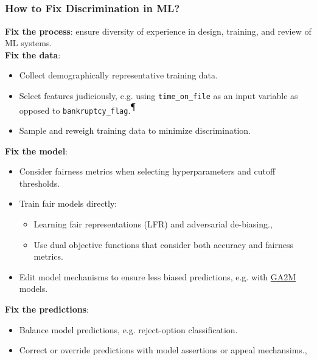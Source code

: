 \documentclass[11pt,
               		aspectratio=169,
               		hyperref={colorlinks}
               		]{beamer}
\begin{document}
		\subsection*{}
		\begin{frame}			
			\frametitle{How to Fix Discrimination in ML?}
			\scriptsize
			\noindent \textbf{Fix the process}: ensure diversity of experience in design, training, and review of ML systems.\\
			\noindent \textbf{Fix the data}:
			\begin{itemize}\scriptsize
				\item Collect demographically representative training data.
				\item Select features judiciously, e.g. using \texttt{time\_on\_file} as an input variable as opposed to \texttt{bankruptcy\_flag}.\textsuperscript{$\mathparagraph$}
				\item Sample and reweigh training data to minimize discrimination.\cite{kamiran2012data}
			\end{itemize}
			\noindent \textbf{Fix the model}:
			\begin{itemize}\scriptsize
				\item Consider fairness metrics when selecting hyperparameters and cutoff thresholds.
				\item Train fair models directly:
				\begin{itemize}\scriptsize
					\item Learning fair representations (LFR) and adversarial de-biasing.\cite{zemel2013learning}, \cite{zhang2018mitigating}
					\item Use dual objective functions that consider both accuracy and fairness metrics.
				\end{itemize}
				\item Edit model mechanisms to ensure less biased predictions, e.g. with \href{https://github.com/interpretml/interpret}{GA2M} models.
			\end{itemize}		
			\noindent \textbf{Fix the predictions}: 
			\begin{itemize}\scriptsize
				\item Balance model predictions, e.g. reject-option classification.\cite{kamiran2012decision}	
				\item Correct or override predictions with model assertions or appeal mechansims.\cite{hall2019guidelines}, \cite{kangdebugging}
			\end{itemize}
		\end{frame}
\end{document}

